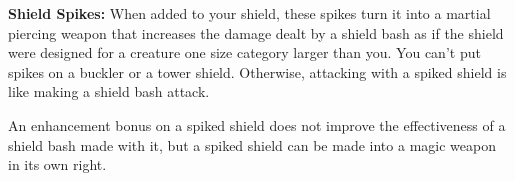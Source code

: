 \textbf{Shield Spikes:} When added to your shield, these spikes turn it into a martial piercing weapon that increases the damage dealt by a shield bash as if the shield were designed for a creature one size category larger than you. You can’t put spikes on a buckler or a tower shield. Otherwise, attacking with a spiked shield is like making a shield bash attack.

An enhancement bonus on a spiked shield does not improve the effectiveness of a shield bash made with it, but a spiked shield can be made into a magic weapon in its own right.